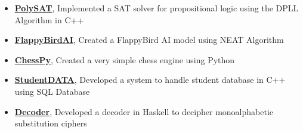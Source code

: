 

\begin{itemize}
\item \textbf{\href{https://github.com/RohitRanjangit/PolySAT}{PolySAT}}, Implemented a SAT solver for propositional logic using the DPLL Algorithm in C++
\item \textbf{\href{https://github.com/RohitRanjangit/FlappyBirdAI}{FlappyBirdAI}}, Created a FlappyBird AI model using NEAT Algorithm
\item \textbf{\href{https://github.com/RohitRanjangit/chessPY}{ChessPy}}, Created a very simple chess engine using Python
\item \textbf{\href{https://github.com/RohitRanjangit/StudentData}{StudentDATA}}, Developed a system to handle student database in C++ using SQL Database
\item \textbf{\href{https://github.com/RohitRanjangit/Decoder}{Decoder}}, Developed a decoder in Haskell to decipher monoalphabetic substitution ciphers
\end{itemize}

